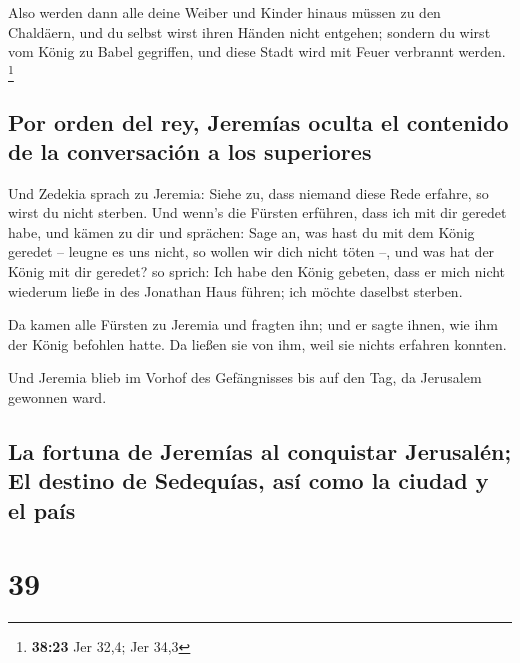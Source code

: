  Also werden dann alle deine Weiber und Kinder hinaus
müssen zu den Chaldäern, und du selbst wirst ihren Händen nicht
entgehen; sondern du wirst vom König zu Babel gegriffen, und diese Stadt
wird mit Feuer verbrannt werden. \footnote{\textbf{38:23} Jer 32,4; Jer
  34,3}

\hypertarget{por-orden-del-rey-jeremuxedas-oculta-el-contenido-de-la-conversaciuxf3n-a-los-superiores}{%
\subsection{Por orden del rey, Jeremías oculta el contenido de la
conversación a los
superiores}\label{por-orden-del-rey-jeremuxedas-oculta-el-contenido-de-la-conversaciuxf3n-a-los-superiores}}

 Und Zedekia sprach zu Jeremia: Siehe zu, dass niemand
diese Rede erfahre, so wirst du nicht sterben.  Und
wenn's die Fürsten erführen, dass ich mit dir geredet habe, und kämen zu
dir und sprächen: Sage an, was hast du mit dem König geredet -- leugne
es uns nicht, so wollen wir dich nicht töten --, und was hat der König
mit dir geredet?  so sprich: Ich habe den König gebeten,
dass er mich nicht wiederum ließe in des Jonathan Haus führen; ich
möchte daselbst sterben.

 Da kamen alle Fürsten zu Jeremia und fragten ihn; und er
sagte ihnen, wie ihm der König befohlen hatte. Da ließen sie von ihm,
weil sie nichts erfahren konnten.

 Und Jeremia blieb im Vorhof des Gefängnisses bis auf den
Tag, da Jerusalem gewonnen ward.

\hypertarget{la-fortuna-de-jeremuxedas-al-conquistar-jerusaluxe9n-el-destino-de-sedequuxedas-asuxed-como-la-ciudad-y-el-pauxeds}{%
\subsection{La fortuna de Jeremías al conquistar Jerusalén; El destino
de Sedequías, así como la ciudad y el
país}\label{la-fortuna-de-jeremuxedas-al-conquistar-jerusaluxe9n-el-destino-de-sedequuxedas-asuxed-como-la-ciudad-y-el-pauxeds}}

\hypertarget{section-38}{%
\section{39}\label{section-38}}


